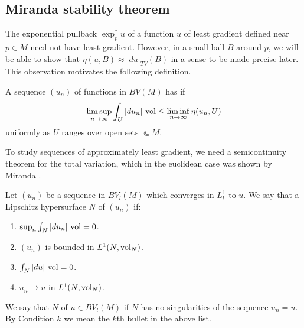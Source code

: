 
\subsection{Miranda stability theorem}\label{MirandaStability}

The exponential pullback $\exp_p^* u$ of a function $u$ of least gradient defined near $p \in M$ need not have least gradient.
However, in a small ball $B$ around $p$, we will be able to show that $\eta(u, B) \approx |du|_{TV}(B)$ in a sense to be made precise later.
This observation motivates the following definition.

\begin{definition}
A sequence $(u_n)$ of functions in $BV(M)$ has  if
$$\limsup_{n \to \infty} \int_U |du_n| ~\mathrm{vol} \leq \liminf_{n \to \infty} \eta(u_n, U)$$
uniformly as $U$ ranges over open sets $\Subset M$.
\end{definition}

To study sequences of approximately least gradient, we need a semicontinuity theorem for the total variation, which in the euclidean case was shown by Miranda \cite[Teorema 3]{Miranda67}.

\begin{definition}
Let $(u_n)$ be a sequence in $BV_l(M)$ which converges in $L^1_l$ to $u$.
We say that a Lipschitz hypersurface $N$  of $(u_n)$ if:
\begin{enumerate}
\item \label{cond1Mir} $\sup_n \int_N |du_n| ~\mathrm{vol} = 0$.
\item \label{cond2Mir} $(u_n)$ is bounded in $L^1(N, \mathrm{vol}_N)$.
\item \label{cond3Mir} $\int_N |du| ~\mathrm{vol} = 0$.
\item \label{cond4Mir} $u_n \to u$ in $L^1(N, \mathrm{vol}_N)$.
\end{enumerate}
We say that $N$  of $u \in BV_l(M)$ if $N$ has no singularities of the sequence $u_n = u$.
By Condition $k$ we mean the $k$th bullet in the above list.
\end{definition}

